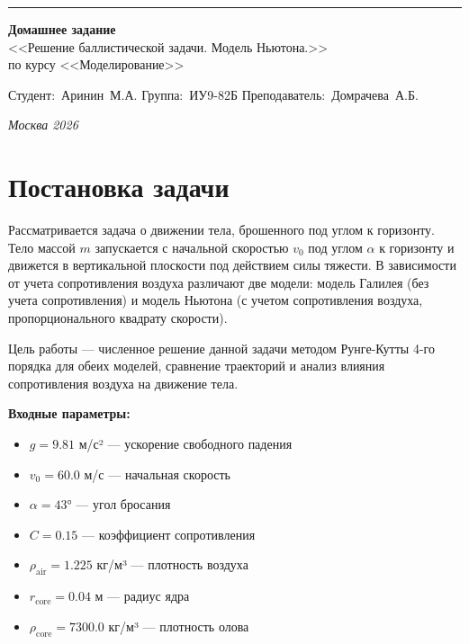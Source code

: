 \documentclass[a4paper, 14pt]{extarticle}
\begin{document}
\begin{titlepage}
\vspace*{-16pt}
\hspace{30pt}\rule{0.866\textwidth}{0.4pt}

\vspace{11em}

\begin{center}
\Large {\bf Домашнее задание} \\ 
\large <<Решение баллистической задачи. Модель Ньютона.>> \\
\large {по курсу <<Моделирование>>} \\

\end{center}\normalsize

\vspace{8em}

\vbox{%
\hfill%
\vbox{%
\hbox{Студент: Аринин М.А.}%
\hbox{Группа: ИУ9-82Б}%
\hbox{Преподаватель: Домрачева А.Б.}%
}%
} 

\bigskip

\vfill


\begin{center}
\textsl{Москва 2026}
\end{center}
\end{titlepage}


\renewcommand{\ttdefault}{pcr}

\setlength{\tabcolsep}{3pt}

\newpage
\setcounter{page}{2}

\section{Постановка задачи}
Рассматривается задача о движении тела, брошенного под углом к горизонту. Тело массой $m$ запускается с начальной скоростью $v_0$ под углом $\alpha$ к горизонту и движется в вертикальной плоскости под действием силы тяжести. В зависимости от учета сопротивления воздуха различают две модели: модель Галилея (без учета сопротивления) и модель Ньютона (с учетом сопротивления воздуха, пропорционального квадрату скорости).

Цель работы --- численное решение данной задачи методом Рунге-Кутты 4-го порядка для обеих моделей, сравнение траекторий и анализ влияния сопротивления воздуха на движение тела.

\textbf{Входные параметры:}
\begin{itemize}
  \item $g = 9.81$ м/с² — ускорение свободного падения
  \item $v_0 = 60.0$ м/с — начальная скорость
  \item $\alpha = 43°$ — угол бросания
  \item $C = 0.15$ — коэффициент сопротивления
  \item $\rho_{\text{air}} = 1.225$ кг/м³ — плотность воздуха
  \item $r_{\text{core}} = 0.04$ м — радиус ядра
  \item $\rho_{\text{core}} = 7300.0$ кг/м³ — плотность олова
\end{itemize}
\end{document}
